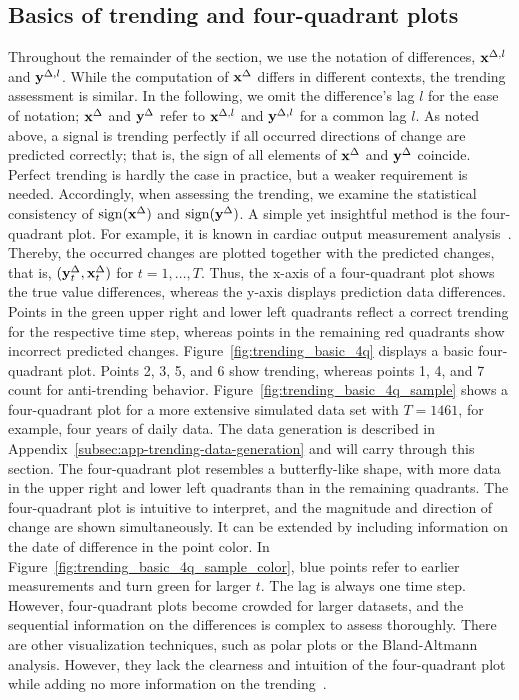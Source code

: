 \subsection{Basics of trending and four-quadrant plots}\label{subsec:trending-basics}

Throughout the remainder of the section, we use the notation of differences, $\mathbf{x}^{\Delta,l}$ and $\mathbf{y}^{\Delta,l}$.
While the computation of $\mathbf{x}^{\Delta}$ differs in different contexts, the trending assessment is similar.
In the following, we omit the difference's lag $l$ for the ease of notation; $\mathbf{x}^{\Delta}$ and $\mathbf{y}^{\Delta}$ refer to $\mathbf{x}^{\Delta,l}$ and $\mathbf{y}^{\Delta,l}$ for a common lag $l$.
As noted above, a signal is trending perfectly if all occurred directions of change are predicted correctly; that is, the sign of all elements of $\mathbf{x}^{\Delta}$ and $\mathbf{y}^{\Delta}$ coincide.
Perfect trending is hardly the case in practice, but a weaker requirement is needed.
Accordingly, when assessing the trending, we examine the statistical consistency of $\operatorname{sign}(\mathbf{x}^{\Delta})$ and $\operatorname{sign}(\mathbf{y}^{\Delta})$.
A simple yet insightful method is the four-quadrant plot.
For example, it is known in cardiac output measurement analysis~\parencite{Saugel2015,perrino1998intraoperative}. 
Thereby, the occurred changes are plotted together with the predicted changes, that is, $(\mathbf{y}^{\Delta}_t, \mathbf{x}^{\Delta}_t)$ for $t = 1, \dots, T$.
Thus, the x-axis of a four-quadrant plot shows the true value differences, whereas the y-axis displays prediction data differences.
Points in the green upper right and lower left quadrants reflect a correct trending for the respective time step, whereas points in the remaining red quadrants show incorrect predicted changes.
Figure~\ref{fig:trending_basic_4q} displays a basic four-quadrant plot.
Points 2, 3, 5, and 6 show trending, whereas points 1, 4, and 7 count for anti-trending behavior.
Figure~\ref{fig:trending_basic_4q_sample} shows a four-quadrant plot for a more extensive simulated data set with $T=1461$, for example, four years of daily data.
The data generation is described in Appendix~\ref{subsec:app-trending-data-generation} and will carry through this section.
The four-quadrant plot resembles a butterfly-like shape, with more data in the upper right and lower left quadrants than in the remaining quadrants.
The four-quadrant plot is intuitive to interpret, and the magnitude and direction of change are shown simultaneously.
It can be extended by including information on the date of difference in the point color.
In Figure~\ref{fig:trending_basic_4q_sample_color}, blue points refer to earlier measurements and turn green for larger $t$.
The lag is always one time step.
However, four-quadrant plots become crowded for larger datasets, and the sequential information on the differences is complex to assess thoroughly.
There are other visualization techniques, such as polar plots or the Bland-Altmann analysis.
However, they lack the clearness and intuition of the four-quadrant plot while adding no more information on the trending~\parencite{Saugel2015}.

